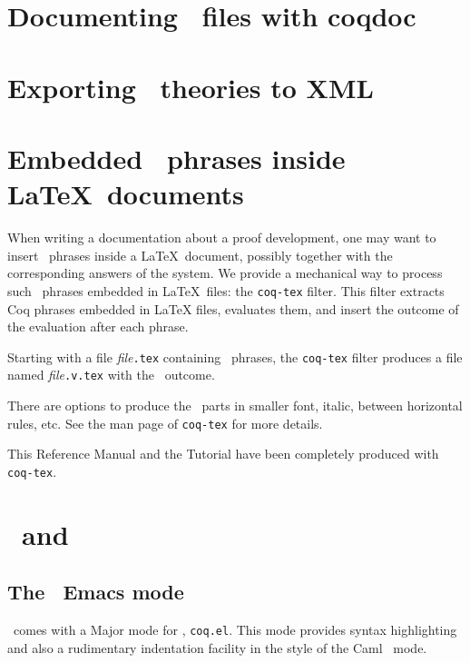 \section[Documenting \Coq\ files with coqdoc]{Documenting \Coq\ files with coqdoc\label{coqdoc}
}



\section{Exporting \Coq\ theories to XML}



\section[Embedded \Coq\ phrases inside \LaTeX\ documents]{Embedded \Coq\ phrases inside \LaTeX\ documents\label{Latex}
  }

When writing a documentation about a proof development, one may want
to insert \Coq\ phrases inside a \LaTeX\ document, possibly together with
the corresponding answers of the system. We provide a
mechanical way to process such \Coq\ phrases embedded in \LaTeX\ files: the
{\tt coq-tex} filter.  This filter extracts Coq phrases embedded in
LaTeX files, evaluates them, and insert the outcome of the evaluation
after each phrase.

Starting with a file {\em file}{\tt.tex} containing \Coq\ phrases,
the {\tt coq-tex} filter produces a file named {\em file}{\tt.v.tex} with
the \Coq\ outcome.

There are options to produce the \Coq\ parts in smaller font, italic,
between horizontal rules, etc.
See the man page of {\tt coq-tex} for more details.

\medskip{} This Reference Manual and the Tutorial
have been completely produced with {\tt coq-tex}.


\section[\Coq\ and \emacs]{\Coq\ and \emacs\label{Emacs}}

\subsection{The \Coq\ Emacs mode}

\Coq\ comes with a Major mode for \emacs, {\tt coq.el}. This mode provides
syntax highlighting
and also a rudimentary indentation facility
in the style of the Caml \emacs\ mode.

